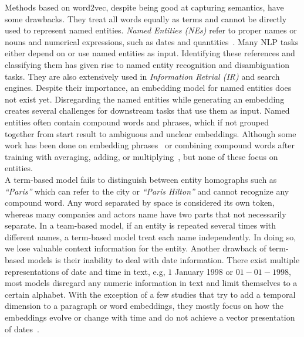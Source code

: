 Methods based on word2vec, despite being good at capturing semantics, have some drawbacks. They treat all words equally as terms and cannot be directly used to represent named entities. \emph{Named Entities (NEs)} refer to proper names or nouns and numerical
expressions, such as dates and quantities~.
Many NLP tasks either depend on or use named entities as input. Identifying these references and classifying them has given rise to named entity recognition and disambiguation tasks. They are also extensively used in \emph{Information Retrial (IR)} and search engines. Despite their importance, an embedding model for named entities does not exist yet. Disregarding the named entities while generating an embedding creates several challenges for downstream tasks that use them as input. Named entities often contain compound words and phrases, which if not grouped together from start result to ambiguous and unclear embeddings. Although some work has been done on embedding phrases~ or combining compound words after training with averaging, adding, or multiplying~, but none of these focus on entities. \\
A term-based model fails to distinguish between entity homographs such as  \emph{``Paris''}  which can refer to the city or \emph{``Paris Hilton''} and cannot recognize any compound word. Any word separated by space is considered its own token, whereas many companies and actors name have two parts that not necessarily separate.  In a team-based model, if an entity is repeated several times with different names, a term-based model treat each name independently. In doing so, we lose valuable context information for the entity. Another drawback of term-based models is their inability to deal with date information. There exist multiple representations of date and time in text, e.g, $1$ January 1998 or $01-01-1998$, most models disregard any numeric information in text and limit themselves to a certain alphabet. With the exception of a few studies that try to add a temporal dimension to a paragraph or word embeddings, they mostly focus on how the embeddings evolve or change with time and do not achieve a vector presentation of dates~.  \\
